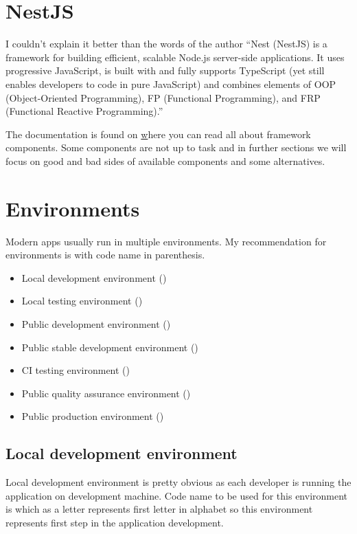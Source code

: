     \section{NestJS}\label{sec:nestjs}

    I couldn't explain it better than the words of the author ``Nest (NestJS) is a framework for building
    efficient, scalable Node.js server-side applications.
    It uses progressive JavaScript, is built with and fully supports
    TypeScript (yet still enables developers to code in pure JavaScript)
    and combines elements of OOP (Object-Oriented Programming),
    FP (Functional Programming), and FRP (Functional Reactive Programming).''

    The documentation is found on \href{https://docs.nestjs.com/} where you can
    read all about framework components.
    Some components are not up to task and in further sections we will focus on good and bad
    sides of available components and some alternatives.


    \section{Environments}\label{sec:environments}
    Modern apps usually run in multiple environments.
    My recommendation for environments is with code name in parenthesis.

    \begin{itemize}
        \item Local development environment ()
        \item Local testing environment ()
        \item Public development environment ()
        \item Public stable development environment ()
        \item CI testing environment ()
        \item Public quality assurance environment ()
        \item Public production environment ()
    \end{itemize}

    \subsection{Local development environment}\label{subsec:local-development-environment}
    Local development environment is pretty obvious as each developer
    is running the application on development machine.
    Code name to be used for this environment is  which as a letter
    represents first letter in alphabet so this environment represents
    first step in the application development.

